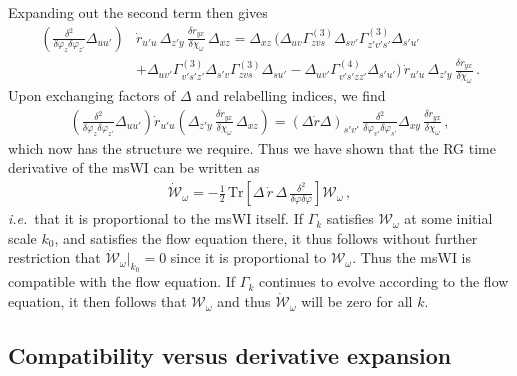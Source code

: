 \documentclass[11pt]{book}
\newcommand\ie{\textit{i.e.}\ }
\numberwithin{equation}{chapter}
\begin{document}
Expanding out the second term then gives
\begin{align}
\label{step1}
	\left(\frac{\delta^2}{\delta\varphi_z\delta\varphi_{z'}}\Delta_{uu'}\right)
	&\dot r_{u'u} \, \Delta_{z'y} \, \frac{\delta r_{yx}}{\delta\chi_\omega} \, \Delta_{xz}
  = \Delta_{xz} \, \bigg(\Delta_{uv}\Gamma^{(3)}_{zvs}\Delta_{sv'}\Gamma^{(3)}_{z'v's'}\Delta_{s'u'} \nonumber\\
    &+\Delta_{uv'}\Gamma^{(3)}_{v's'z'}\Delta_{s'v}\Gamma^{(3)}_{zvs}\Delta_{su'}
  -\Delta_{uv'}\Gamma^{(4)}_{v's'zz'}\Delta_{s'u'}\bigg) \,
	\dot r_{u'u} \, \Delta_{z'y} \, \frac{\delta r_{yx}}{\delta\chi_\omega} \,.
\end{align}
Upon exchanging factors of $\Delta$ and relabelling indices, we find
\begin{align}
\label{step2}
	\left(\frac{\delta^2}{\delta\varphi_{z}\delta\varphi_{z'}}\Delta_{uu'}\right)
	\dot r_{u'u}\left(\Delta_{z'y} \, \frac{\delta r_{yx}}{\delta\chi_{\omega}} \, \Delta_{xz}\right)=
	(\Delta\dot r\Delta)_{s'v'} \, \frac{\delta^2}{\delta\varphi_{v'}\delta\varphi_{s'}}
	\Delta_{xy} \, \frac{\delta r_{yx}}{\delta\chi_{\omega}} \,,
\end{align}
which now has the structure we require.
Thus we have shown that the RG time derivative of the msWI can be written as
\begin{align}
	\mathcal{\dot W}_{\omega}=-\frac{1}{2} \, \mathrm{Tr}
	\left[\Delta \, \dot r \, \Delta \, \frac{\delta^2}{\delta\varphi\delta\varphi}\right]
  \mathcal{W}_{\omega} \,,
\end{align}
\ie that it is proportional to the msWI itself.
If $\Gamma_{k}$ satisfies $\mathcal{W_\omega}$ at some initial scale $k_0$,
and satisfies the flow equation there, it thus follows without further restriction that
$\mathcal{\dot W_\omega}|_{k_{0}}=0$ since it is proportional to $\mathcal{W_\omega}$.
Thus the msWI is compatible with the flow equation.
If $\Gamma_{k}$ continues to evolve according to the flow equation,
it then follows that $\mathcal{W_\omega}$ and thus $\mathcal{\dot W_\omega}$ will be zero for all $k$.


\subsection{Compatibility versus derivative expansion}
\label{sec:exact-vs-derivatives}
\end{document}
